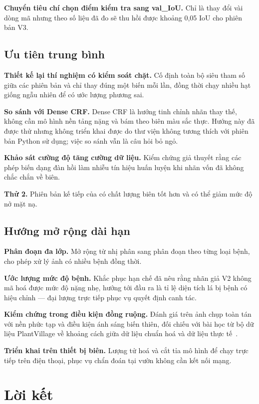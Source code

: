 \textbf{Chuyển tiêu chí chọn điểm kiểm tra sang val\_IoU.} Chỉ là thay đổi vài
dòng mã nhưng theo số liệu đã đo sẽ thu hồi được khoảng 0,05 IoU cho phiên bản V3.

\subsection{Ưu tiên trung bình}

\textbf{Thiết kế lại thí nghiệm có kiểm soát chặt.} Cố định toàn bộ siêu tham số
giữa các phiên bản và chỉ thay đúng một biến mỗi lần, đồng thời chạy nhiều hạt
giống ngẫu nhiên để có ước lượng phương sai.

\textbf{So sánh \SAM{} với Dense CRF.} Dense CRF là hướng tinh chỉnh nhãn thay thế,
không cần mô hình nền tảng nặng và bám theo biên màu sắc thực. Hướng này đã được
thử nhưng không triển khai được do thư viện không tương thích với phiên bản Python
sử dụng; việc so sánh vẫn là câu hỏi bỏ ngỏ.

\textbf{Khảo sát cường độ tăng cường dữ liệu.} Kiểm chứng giả thuyết rằng các phép
biến dạng đàn hồi làm nhiễu tín hiệu huấn luyện khi nhãn vốn đã không chắc chắn về
biên.

\textbf{Thử \SAM{}2.} Phiên bản kế tiếp của \SAM{} có chất lượng biên tốt hơn và
có thể giảm mức độ nở mặt nạ.

\subsection{Hướng mở rộng dài hạn}

\textbf{Phân đoạn đa lớp.} Mở rộng từ nhị phân sang phân đoạn theo từng loại bệnh,
cho phép xử lý ảnh có nhiều bệnh đồng thời.

\textbf{Ước lượng mức độ bệnh.} Khắc phục hạn chế đã nêu rằng nhãn giả V2 không mã
hoá được mức độ nặng nhẹ, hướng tới đầu ra là tỉ lệ diện tích lá bị bệnh có hiệu
chỉnh --- đại lượng trực tiếp phục vụ quyết định canh tác.

\textbf{Kiểm chứng trong điều kiện đồng ruộng.} Đánh giá trên ảnh chụp toàn tán với
nền phức tạp và điều kiện ánh sáng biến thiên, đối chiếu với bài học từ bộ dữ liệu
PlantVillage về khoảng cách giữa dữ liệu chuẩn hoá và dữ liệu thực
tế~\cite{mohanty2016plantdisease}.

\textbf{Triển khai trên thiết bị biên.} Lượng tử hoá và cắt tỉa mô hình để chạy
trực tiếp trên điện thoại, phục vụ chẩn đoán tại vườn không cần kết nối mạng.

\section{Lời kết}

